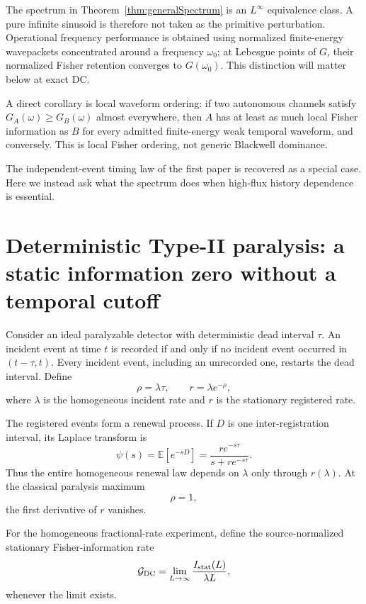 \documentclass[aps,prapplied,preprint,nofootinbib]{revtex4-2}
\newcommand{\GDC}{\mathcal G_{\rm DC}}
\newcommand{\E}{\mathbb E}
\begin{document}
The spectrum in Theorem~\ref{thm:generalSpectrum} is an $L^\infty$ equivalence class. A pure infinite sinusoid is therefore not taken as the primitive perturbation. Operational frequency performance is obtained using normalized finite-energy wavepackets concentrated around a frequency $\omega_0$; at Lebesgue points of $G$, their normalized Fisher retention converges to $G(\omega_0)$. This distinction will matter below at exact DC.

A direct corollary is local waveform ordering: if two autonomous channels satisfy $G_A(\omega)\ge G_B(\omega)$ almost everywhere, then $A$ has at least as much local Fisher information as $B$ for every admitted finite-energy weak temporal waveform, and conversely. This is local Fisher ordering, not generic Blackwell dominance.

The independent-event timing law of the first paper is recovered as a special case. Here we instead ask what the spectrum does when high-flux history dependence is essential.

\section{Deterministic Type-II paralysis: a static information zero without a temporal cutoff}
\label{sec:detTypeII}

Consider an ideal paralyzable detector with deterministic dead interval $\tau$. An incident event at time $t$ is recorded if and only if no incident event occurred in $(t-\tau,t)$. Every incident event, including an unrecorded one, restarts the dead interval. Define
\begin{equation}
\rho=\lambda\tau,
\qquad
r=\lambda e^{-\rho},
\label{eq:detRate}
\end{equation}
where $\lambda$ is the homogeneous incident rate and $r$ is the stationary registered rate.

The registered events form a renewal process. If $D$ is one inter-registration interval, its Laplace transform is
\begin{equation}
\psi(s)=\E[e^{-sD}]
=\frac{r e^{-s\tau}}{s+r e^{-s\tau}}.
\label{eq:detIntervalLT}
\end{equation}
Thus the entire homogeneous renewal law depends on $\lambda$ only through $r(\lambda)$. At the classical paralysis maximum
\begin{equation}
\rho=1,
\end{equation}
the first derivative of $r$ vanishes.

For the homogeneous fractional-rate experiment, define the source-normalized stationary Fisher-information rate
\begin{equation}
\GDC
=\lim_{L\to\infty}
\frac{I_{\rm stat}(L)}{\lambda L},
\label{eq:GDCdef}
\end{equation}
whenever the limit exists.
\end{document}
